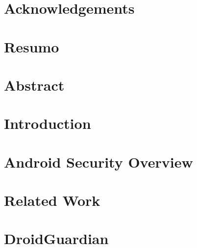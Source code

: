 \documentclass[a4paper,12pt,twoside]{book}
\begin{document}
\frontmatter


%




 \setcounter{page}{1}

\chapter*{Acknowledgements}


\chapter*{Resumo}


\chapter*{Abstract}


\cleardoublepage
{}\setcounter{page}{1}
\tableofcontents

\listoffigures
{}

\listoftables
{}

\printglossary[type=\acronymtype]



\mainmatter
\chapter{Introduction}\label{sec:introduction}


\chapter{Android Security Overview}

\chapter{Related Work}

\chapter{DroidGuardian}
\end{document}
